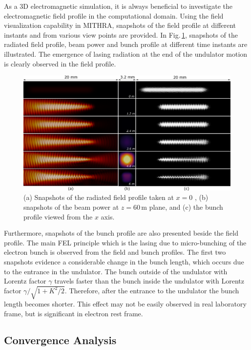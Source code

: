 As a 3D electromagnetic simulation, it is always beneficial to investigate the electromagnetic field profile in the computational domain.
%
Using the field visualization capability in MITHRA, snapshots of the field profile at different instants and from various view points are provided.
%
In Fig.\,\ref{profile-example1}, snapshots of the radiated field profile, beam power and bunch profile at different time instants are illustrated.
%
The emergence of lasing radiation at the end of the undulator motion is clearly observed in the field profile.
%
\begin{figure}
\centering
\includegraphics[width=7.0in]{./MITHRA_EXAMPLES/Fig2/Fig2.pdf}
\caption{(a) Snapshots of the radiated field profile taken at $x=0$ , (b) snapshots of the beam power at $z=60$\,{\textmu}m plane, and (c) the bunch profile viewed from the $x$ axis.}
\label{profile-example1}
\end{figure}
%
Furthermore, snapshots of the bunch profile are also presented beside the field profile.
%
The main FEL principle which is the lasing due to micro-bunching of the electron bunch is observed from the field and bunch profiles.
%
The first two snapshots evidence a considerable change in the bunch length, which occurs due to the entrance in the undulator.
%
The bunch outside of the undulator with Lorentz factor $\gamma$ travels faster than the bunch inside the undulator with Lorentz factor $\gamma/\sqrt{1+K^2/2}$.
%
Therefore, after the entrance to the undulator the bunch length becomes shorter.
%
This effect may not be easily observed in real laboratory frame, but is significant in electron rest frame.

\subsection{Convergence Analysis}

